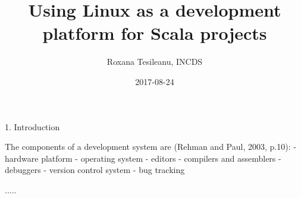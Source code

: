 \documentclass{article}
\title{Using Linux as a development platform for Scala projects}
\date{2017-08-24}
\author{Roxana Tesileanu, INCDS}
\begin{document}
	\maketitle
	\newpage

1. Introduction

The components of a development system are (Rehman and Paul, 2003, p.10):
- hardware platform
- operating system
- editors 
- compilers and assemblers
- debuggers
- version control system
- bug tracking

.....
  
\end{document}
